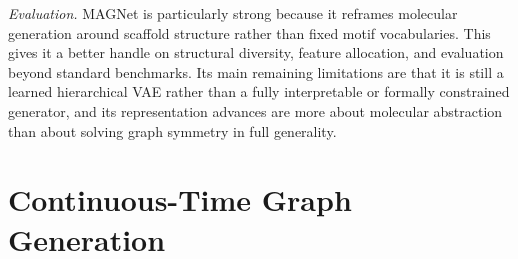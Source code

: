 \documentclass{article}
\begin{document}
\emph{Evaluation.} MAGNet is particularly strong because it reframes molecular generation around scaffold structure rather than fixed motif vocabularies. This gives it a better handle on structural diversity, feature allocation, and evaluation beyond standard benchmarks. Its main remaining limitations are that it is still a learned hierarchical VAE rather than a fully interpretable or formally constrained generator, and its representation advances are more about molecular abstraction than about solving graph symmetry in full generality.


\label{sec:dt_summary}








\section{Continuous-Time Graph Generation}
\label{sec:continuous_time}
\end{document}
